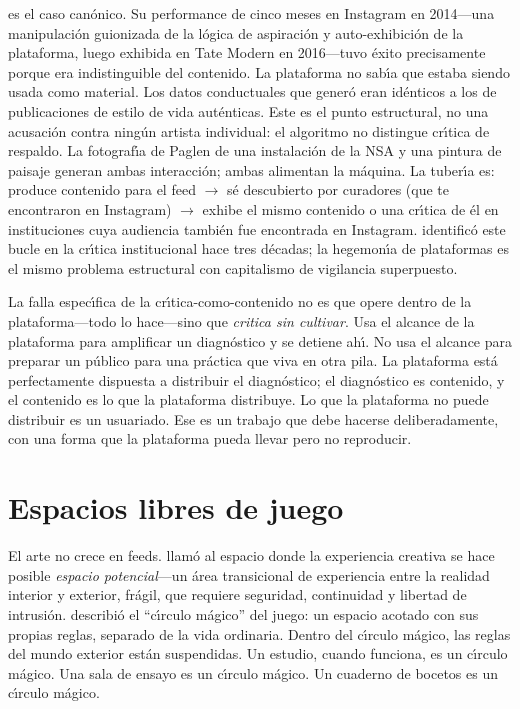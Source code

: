 \documentclass[10pt,letterpaper,twocolumn]{article}
\begin{document}
\citet{ulman2014excellences} es el caso can\'{o}nico. Su performance de cinco meses en Instagram en 2014---una manipulaci\'{o}n guionizada de la l\'{o}gica de aspiraci\'{o}n y auto-exhibici\'{o}n de la plataforma, luego exhibida en Tate Modern en 2016---tuvo \'{e}xito precisamente porque era indistinguible del contenido. La plataforma no sab\'{\i}a que estaba siendo usada como material. Los datos conductuales que gener\'{o} eran id\'{e}nticos a los de publicaciones de estilo de vida aut\'{e}nticas. Este es el punto estructural, no una acusaci\'{o}n contra ning\'{u}n artista individual: el algoritmo no distingue cr\'{\i}tica de respaldo. La fotograf\'{\i}a de Paglen de una instalaci\'{o}n de la NSA y una pintura de paisaje generan ambas interacci\'{o}n; ambas alimentan la m\'{a}quina. La tuber\'{\i}a es: produce contenido para el feed $\rightarrow$ s\'{e} descubierto por curadores (que te encontraron en Instagram) $\rightarrow$ exhibe el mismo contenido o una cr\'{\i}tica de \'{e}l en instituciones cuya audiencia tambi\'{e}n fue encontrada en Instagram. \citet{fraser2005critique} identific\'{o} este bucle en la cr\'{\i}tica institucional hace tres d\'{e}cadas; la hegemon\'{\i}a de plataformas es el mismo problema estructural con capitalismo de vigilancia superpuesto.

La falla espec\'{\i}fica de la cr\'{\i}tica-como-contenido no es que opere dentro de la plataforma---todo lo hace---sino que \emph{critica sin cultivar}. Usa el alcance de la plataforma para amplificar un diagn\'{o}stico y se detiene ah\'{\i}. No usa el alcance para preparar un p\'{u}blico para una pr\'{a}ctica que viva en otra pila. La plataforma est\'{a} perfectamente dispuesta a distribuir el diagn\'{o}stico; el diagn\'{o}stico es contenido, y el contenido es lo que la plataforma distribuye. Lo que la plataforma no puede distribuir es un usuariado. Ese es un trabajo que debe hacerse deliberadamente, con una forma que la plataforma pueda llevar pero no reproducir.

\section{Espacios libres de juego}

El arte no crece en feeds. \citet{winnicott1971playing} llam\'{o} al espacio donde la experiencia creativa se hace posible \emph{espacio potencial}---un \'{a}rea transicional de experiencia entre la realidad interior y exterior, fr\'{a}gil, que requiere seguridad, continuidad y libertad de intrusi\'{o}n. \citet{huizinga1938homo} describi\'{o} el ``c\'{\i}rculo m\'{a}gico'' del juego: un espacio acotado con sus propias reglas, separado de la vida ordinaria. Dentro del c\'{\i}rculo m\'{a}gico, las reglas del mundo exterior est\'{a}n suspendidas. Un estudio, cuando funciona, es un c\'{\i}rculo m\'{a}gico. Una sala de ensayo es un c\'{\i}rculo m\'{a}gico. Un cuaderno de bocetos es un c\'{\i}rculo m\'{a}gico.
\end{document}
